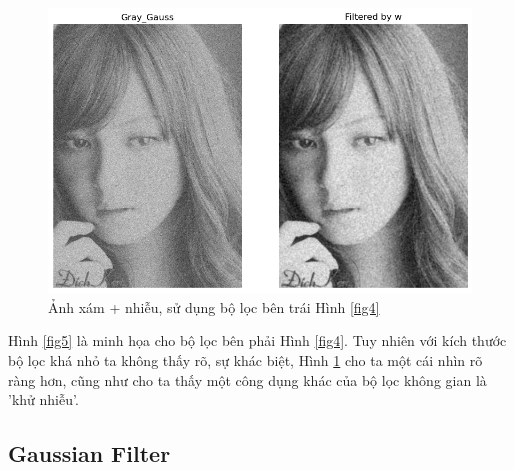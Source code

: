 \documentclass{article}
\begin{document}
    \begin{figure}[ht!]
        \centering
        \includegraphics[width = 0.8\linewidth]{download (1).png}
        \caption{Ảnh xám + nhiễu, sử dụng bộ lọc bên trái Hình \ref{fig4}}
        \label{fig6}
    \end{figure}
    Hình \ref{fig5} là minh họa cho bộ lọc bên phải Hình \ref{fig4}. Tuy nhiên với kích thước bộ lọc khá nhỏ ta không thấy rõ, sự khác biệt, Hình \ref{fig6} cho ta một cái nhìn rõ ràng hơn, cũng như cho ta thấy một công dụng khác của bộ lọc không gian là 'khử nhiễu'.

    \subsection{Gaussian Filter}
    \label{2}
\end{document}
